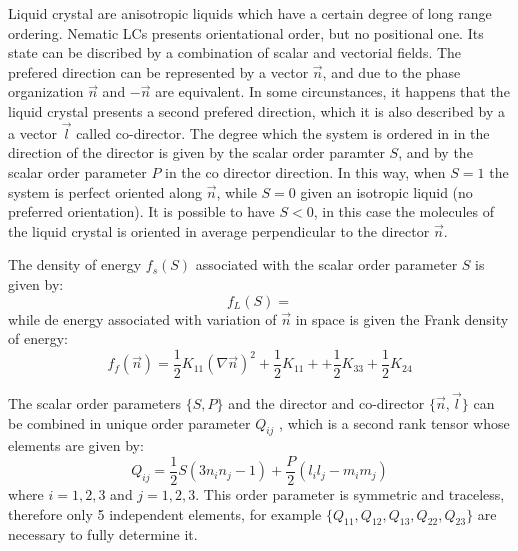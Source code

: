 \documentclass[final,5p,times,twocolumn]{elsarticle}
\newcounter{bla}
\begin{document}
Liquid crystal are anisotropic liquids which have a certain degree of
long range ordering. Nematic LCs presents orientational order, but no
positional one. Its state can be discribed by a combination of scalar
and vectorial fields.  The prefered direction can be represented by a
vector $\vec{n}$, and due to the phase organization $\vec{n}$ and
$-\vec{n}$ are equivalent. In some circunstances, it happens that the
liquid crystal presents a second prefered direction, which it is also
described by a a vector $\vec{l}$ called co-director. The degree which
the system is ordered in in the direction of the director is given by
the scalar order paramter $S$, and by the scalar order parameter $P$
in the co director direction. In this way, when $S=1$ the system is
perfect oriented along $\vec{n}$, while $S=0$ given an isotropic
liquid (no preferred orientation). It is possible to have $S <0$, in
this case the molecules of the liquid crystal is oriented in average
perpendicular to the director $\vec{n}$. 

The density of energy $f_s(S)$ associated with the scalar order
parameter $S$ is given by:
\begin{equation}
  f_L(S)=
\end{equation}
while de energy associated with variation of $\vec{n}$ in space is
given the Frank density of energy:
\begin{equation}
  f_f(\vec{n})=\dfrac{1}{2} K_{11} (\nabla \vec{n})^2 + \dfrac{1}{2} K_{11}+
  +\dfrac{1}{2} K_{33} +\dfrac{1}{2} K_{24}  
\end{equation}

The scalar order parameters $\lbrace S, P \rbrace$ and the director
and co-director $\lbrace \vec{n}, \vec{l} \rbrace$ can be combined in
unique order parameter $Q_{ij}$ , which is a second rank tensor whose
elements are given by:
\begin{equation}\label{eq:tensorial_parameter}
  Q_{ij}=\dfrac{1}{2} S ( 3 n_{i} n_{j}- 1) + \dfrac{P}{2} (l_i l_j - m_i m_j)
\end{equation}
where $i=1,2,3$ and $j=1,2,3$.  This order parameter is symmetric and traceless, therefore only 5 independent elements, for example $\lbrace Q_{11}, Q_{12},Q_{13}, Q_{22}, Q_{23} \rbrace $ are necessary to fully determine it.
\end{document}
